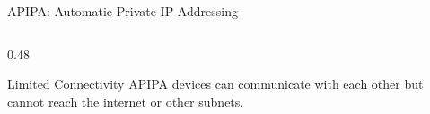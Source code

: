 \documentclass[aspectratio=169]{beamer}  %
\begin{document}
\begin{frame}{APIPA: Automatic Private IP Addressing}
\begin{columns}[T]
\begin{column}{0.48\textwidth}
\begin{center}
            \end{center}
            
            \vspace{0.2em}
            \begin{exampleblock}{Limited Connectivity}
                \small
                APIPA devices can communicate with each other but cannot reach the internet or other subnets.
            \end{exampleblock}
        \end{column}
    \end{columns}
\end{frame}
\end{document}
